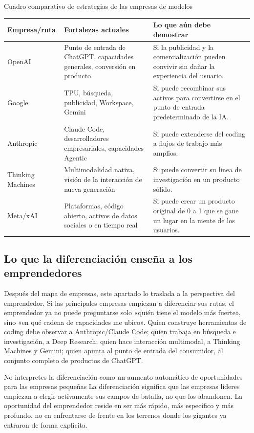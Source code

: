 \documentclass[a4paper]{article}
\begin{document}
\begin{knowledgebox}{Cuadro comparativo de estrategias de las empresas de modelos}
\begin{tabularx}{\textwidth}{p{}p{}p{}}
\toprule
Empresa/ruta & Fortalezas actuales & Lo que aún debe demostrar \\
\midrule
OpenAI & Punto de entrada de ChatGPT, capacidades generales, conversión en producto & Si la publicidad y la comercialización pueden convivir sin dañar la experiencia del usuario. \\
Google & TPU, búsqueda, publicidad, Workspace, Gemini & Si puede recombinar sus activos para convertirse en el punto de entrada predeterminado de la IA. \\
Anthropic & Claude Code, desarrolladores empresariales, capacidades Agentic & Si puede extenderse del coding a flujos de trabajo más amplios. \\
Thinking Machines & Multimodalidad nativa, visión de la interacción de nueva generación & Si puede convertir su línea de investigación en un producto sólido. \\
Meta/xAI & Plataformas, código abierto, activos de datos sociales o en tiempo real & Si puede crear un producto original de 0 a 1 que se gane un lugar en la mente de los usuarios. \\
\bottomrule
\end{tabularx}
\end{knowledgebox}

\subsection{Lo que la diferenciación enseña a los emprendedores}

Después del mapa de empresas, este apartado lo traslada a la perspectiva del emprendedor. Si las principales empresas empiezan a diferenciar sus rutas, el emprendedor ya no puede preguntarse solo «quién tiene el modelo más fuerte», sino «en qué cadena de capacidades me ubico». Quien construye herramientas de coding debe observar a Anthropic/Claude Code; quien trabaja en búsqueda e investigación, a Deep Research; quien hace interacción multimodal, a Thinking Machines y Gemini; quien apunta al punto de entrada del consumidor, al conjunto completo de productos de ChatGPT.

\begin{warningbox}{No interpretes la diferenciación como un aumento automático de oportunidades para las empresas pequeñas}
La diferenciación significa que las empresas líderes empiezan a elegir activamente sus campos de batalla, no que los abandonen. La oportunidad del emprendedor reside en ser más rápido, más específico y más profundo, no en enfrentarse de frente en los terrenos donde los gigantes ya entraron de forma explícita.
\end{warningbox}
\end{document}
